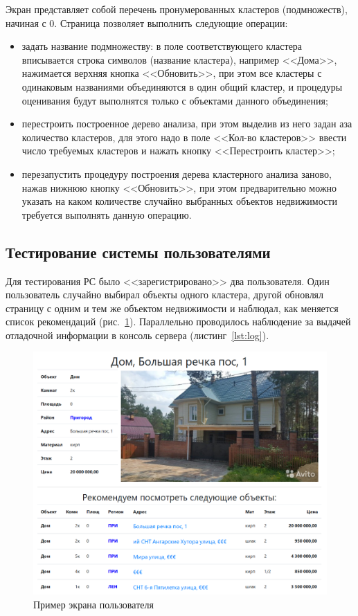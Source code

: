 \documentclass[a4paper,14pt,openany,final]{extreport} %
\def\oldcaption{} \let\oldcaption=\caption
\def\caption{\stepcounter{captionsnum}\oldcaption}
\begin{document}
{Экран представляет собой перечень пронумерованных кластеров (подмножеств), начиная с 0.  Страница позволяет выполнить следующие операции:
\begin{itemize}
\item задать название подмножеству: в поле соответствующего кластера вписывается строка символов (название кластера), например <<Дома>>, нажимается верхняя кнопка <<Обновить>>, при этом все кластеры с одинаковым названиями объединяются в один общий кластер, и процедуры оценивания будут выполнятся только с объектами данного объединения;
\item перестроить построенное дерево анализа, при этом выделив из него задан аза количество кластеров, для этого надо в поле <<Кол-во кластеров>> ввести число требуемых кластеров и нажать кнопку <<Перестроить кластер>>;
\item перезапустить процедуру построения дерева кластерного анализа заново, нажав нижнюю кнопку <<Обновить>>, при этом предварительно можно указать на каком количестве случайно выбранных объектов недвижимости требуется выполнять данную операцию.
\end{itemize}

\subsection{Тестирование системы пользователями}
Для тестирования РС было <<зарегистрировано>> два пользователя. Один пользователь случайно выбирал объекты одного кластера, другой обновлял страницу с одним и тем же объектом недвижимости и наблюдал, как меняется список рекомендаций (рис.~\ref{fig:tetingbyuser}). Параллельно проводилось наблюдение за выдачей отладочной информации в консоль сервера (листинг~\ref{lst:log}).

\begin{figure}[htbp]
  \centering
  \includegraphics[width=0.8\linewidth]{screen-recommends.png}
  \caption{Пример экрана пользователя}
  \label{fig:tetingbyuser}
\end{figure}

}
\end{document}
